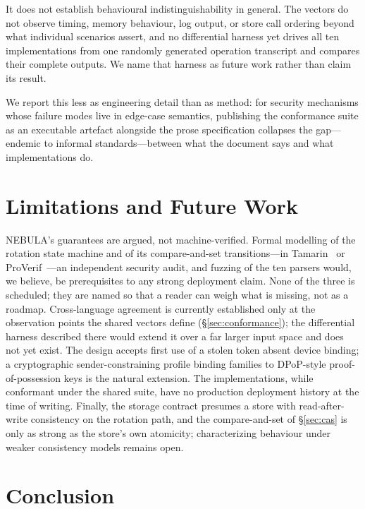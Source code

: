 \documentclass[11pt]{article}
\begin{document}
It does not establish behavioural indistinguishability in general. The
vectors do not observe timing, memory behaviour, log output, or store call
ordering beyond what individual scenarios assert, and no differential
harness yet drives all ten implementations from one randomly generated
operation transcript and compares their complete outputs. We name that
harness as future work rather than claim its result.

We report this less as engineering detail than as method: for security
mechanisms whose failure modes live in edge-case semantics, publishing the
conformance suite as an executable artefact alongside the prose
specification collapses the gap---endemic to informal standards---between
what the document says and what implementations do.

\section{Limitations and Future Work}
\label{sec:limitations}

NEBULA's guarantees are argued, not machine-verified. Formal modelling of the
rotation state machine and of its compare-and-set transitions---in
Tamarin~\cite{tamarin} or ProVerif~\cite{proverif}---an independent security
audit, and fuzzing of the ten parsers would, we believe, be prerequisites to
any strong deployment claim. None of the three is scheduled; they are named so
that a reader can weigh what is missing, not as a roadmap. Cross-language agreement is
currently established only at the observation points the shared vectors
define (\S\ref{sec:conformance}); the differential harness described there
would extend it over a far larger input space and does not yet exist. The
design accepts first use of a stolen token absent device binding; a
cryptographic sender-constraining profile binding families to DPoP-style
proof-of-possession keys is the natural extension. The implementations,
while conformant under the shared suite, have no production deployment
history at the time of writing. Finally, the storage contract
presumes a store with read-after-write consistency on the rotation path, and
the compare-and-set of \S\ref{sec:cas} is only as strong as the store's own
atomicity; characterizing behaviour under weaker consistency models remains
open.

\section{Conclusion}
\end{document}
